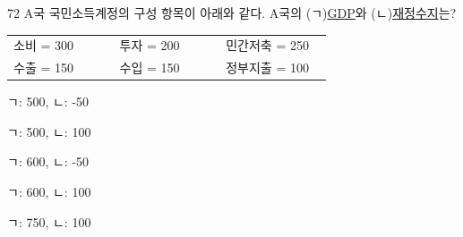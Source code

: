 \begin{question}{72}
A국 국민소득계정의 구성 항목이 아래와 같다. A국의 (ㄱ)\uline{GDP}와 (ㄴ)\uline{재정수지}는?
\begin{framedtext}
\begin{tabular}{@{}p{0.3\linewidth}p{0.3\linewidth}p{0.3\linewidth}@{}}
소비 = 300 & 투자 = 200 & 민간저축 = 250 \\
수출 = 150 & 수입 = 150 & 정부지출 = 100
\end{tabular}
\end{framedtext}
\begin{choices}
  \item ㄱ: 500, ㄴ: -50
  \item ㄱ: 500, ㄴ: 100
  \item ㄱ: 600, ㄴ: -50
  \item ㄱ: 600, ㄴ: 100
  \item ㄱ: 750, ㄴ: 100
\end{choices}
\end{question}
